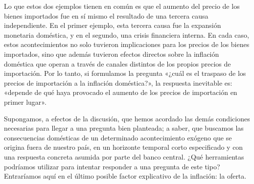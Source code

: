 \documentclass[10pt,a4paper]{article}
\begin{document}
Lo que estos dos ejemplos tienen en común es que el aumento del precio de los bienes importados fue en sí mismo el resultado de una tercera causa independiente. En el primer ejemplo, esta tercera causa fue la expansión monetaria doméstica, y en el segundo, una crisis financiera interna. En cada caso, estos acontecimientos no solo tuvieron implicaciones para los precios de los bienes importados, sino que además tuvieron efectos directos sobre la inflación doméstica que operan a través de canales distintos de los propios precios de importación. Por lo tanto, si formulamos la pregunta «¿cuál es el traspaso de los precios de importación a la inflación doméstica?», la respuesta inevitable es: «depende de qué haya provocado el aumento de los precios de importación en primer lugar».

Supongamos, a efectos de la discusión, que hemos acordado las demás condiciones necesarias para llegar a una pregunta bien planteada; a saber, que buscamos las consecuencias domésticas de un determinado acontecimiento exógeno que se origina fuera de nuestro país, en un horizonte temporal corto especificado y con una respuesta concreta asumida por parte del banco central. ¿Qué herramientas podríamos utilizar para intentar responder a una pregunta de este tipo? Entraríamos aquí en el último posible factor explicativo de la inflación: la oferta.
\end{document}
